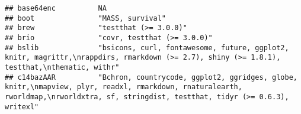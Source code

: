 \documentclass[
]{article}
\begin{document}
\begin{verbatim}
## base64enc          NA                                                                                                                                                                                                                                                                                                                                                                                                                                                                                
## boot               "MASS, survival"                                                                                                                                                                                                                                                                                                                                                                                                                                                                  
## brew               "testthat (>= 3.0.0)"                                                                                                                                                                                                                                                                                                                                                                                                                                                             
## brio               "covr, testthat (>= 3.0.0)"                                                                                                                                                                                                                                                                                                                                                                                                                                                       
## bslib              "bsicons, curl, fontawesome, future, ggplot2, knitr, magrittr,\nrappdirs, rmarkdown (>= 2.7), shiny (>= 1.8.1), testthat,\nthematic, withr"                                                                                                                                                                                                                                                                                                                                       
## c14bazAAR          "Bchron, countrycode, ggplot2, ggridges, globe, knitr,\nmapview, plyr, readxl, rmarkdown, rnaturalearth, rworldmap,\nrworldxtra, sf, stringdist, testthat, tidyr (>= 0.6.3), writexl"                                                                                                                                                                                                                                                                                             

\end{verbatim}
\end{document}
